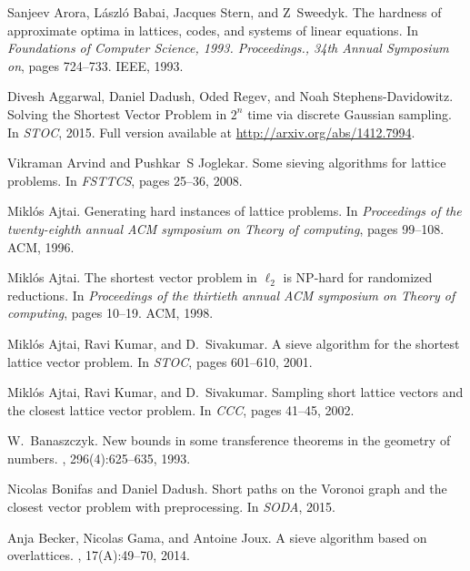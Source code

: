 \documentclass[11pt]{article}
\begin{document}

\newcommand{\etalchar}[1]{$^{#1}$}
\begin{thebibliography}{DKRS03}

Sanjeev Arora, L{\'a}szl{\'o} Babai, Jacques Stern, and Z~Sweedyk.
\newblock The hardness of approximate optima in lattices, codes, and systems of
  linear equations.
\newblock In {\em Foundations of Computer Science, 1993. Proceedings., 34th
  Annual Symposium on}, pages 724--733. IEEE, 1993.

Divesh Aggarwal, Daniel Dadush, Oded Regev, and Noah Stephens{-}Davidowitz.
\newblock Solving the {S}hortest {V}ector {P}roblem in $2^n$ time via discrete
  {G}aussian sampling.
\newblock In {\em STOC}, 2015.
\newblock Full version available at \url{http://arxiv.org/abs/1412.7994}.

Vikraman Arvind and Pushkar~S Joglekar.
\newblock Some sieving algorithms for lattice problems.
\newblock In {\em FSTTCS}, pages 25--36, 2008.

Mikl{\'o}s Ajtai.
\newblock Generating hard instances of lattice problems.
\newblock In {\em Proceedings of the twenty-eighth annual ACM symposium on
  Theory of computing}, pages 99--108. ACM, 1996.

Mikl{\'o}s Ajtai.
\newblock The shortest vector problem in $\ell_2$ is {NP}-hard for randomized
  reductions.
\newblock In {\em Proceedings of the thirtieth annual ACM symposium on Theory
  of computing}, pages 10--19. ACM, 1998.

Mikl\'{o}s Ajtai, Ravi Kumar, and D.~Sivakumar.
\newblock A sieve algorithm for the shortest lattice vector problem.
\newblock In {\em STOC}, pages 601--610, 2001.

Mikl{\'o}s Ajtai, Ravi Kumar, and D.~Sivakumar.
\newblock Sampling short lattice vectors and the closest lattice vector
  problem.
\newblock In {\em CCC}, pages 41--45, 2002.

W.~Banaszczyk.
\newblock New bounds in some transference theorems in the geometry of numbers.
, 296(4):625--635, 1993.

Nicolas Bonifas and Daniel Dadush.
\newblock Short paths on the {V}oronoi graph and the closest vector problem
  with preprocessing.
\newblock In {\em SODA}, 2015.

Anja Becker, Nicolas Gama, and Antoine Joux.
\newblock A sieve algorithm based on overlattices.
, 17(A):49--70, 2014.


\end{thebibliography}
\end{document}
